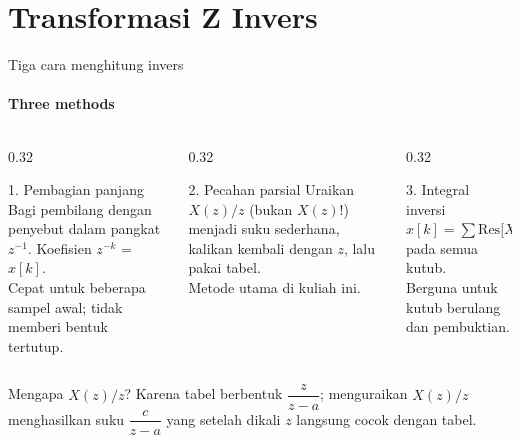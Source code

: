 \documentclass[aspectratio=169,10pt]{beamer}
\begin{document}
\section{Transformasi Z Invers\texorpdfstring{\\[4pt]{\Large{}}}{ / The Inverse Z-Transform}}

\begin{frame}{Tiga cara menghitung invers}
	\framesubtitle{Three methods}
	\begin{columns}[T]
		\begin{column}{0.32\textwidth}
			\begin{block}{1. Pembagian panjang}
				\small
				Bagi pembilang dengan penyebut dalam pangkat $z^{-1}$. Koefisien $z^{-k}$ = $x[k]$.\\[2pt]
				Cepat untuk beberapa sampel awal; tidak memberi bentuk tertutup.
			\end{block}
		\end{column}
		\begin{column}{0.32\textwidth}
			\begin{block}{2. Pecahan parsial}
				\small
				Uraikan $X(z)/z$ (bukan $X(z)$!) menjadi suku sederhana, kalikan kembali dengan $z$, lalu pakai tabel.\\[2pt]
				Metode utama di kuliah ini.
			\end{block}
		\end{column}
		\begin{column}{0.32\textwidth}
			\begin{block}{3. Integral inversi}
				\small
				$x[k] = \sum \text{Res}\big[X(z)z^{k-1}\big]$ pada semua kutub.\\[2pt]
				Berguna untuk kutub berulang dan pembuktian.
			\end{block}
		\end{column}
	\end{columns}
	\vspace{0.3cm}
	\small Mengapa $X(z)/z$? Karena tabel berbentuk $\dfrac{z}{z-a}$; menguraikan $X(z)/z$ menghasilkan suku $\dfrac{c}{z-a}$ yang setelah dikali $z$ langsung cocok dengan tabel.
\end{frame}
\end{document}
